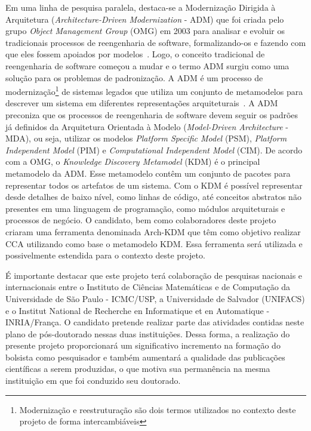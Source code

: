 \documentclass[12pt]{article}
\begin{document}
Em uma linha de pesquisa paralela, destaca-se a Modernização Dirigida à Arquitetura (\textit{Architecture-Driven Modernization} - ADM) que foi criada pelo grupo \textit{Object Management Group} (OMG) em 2003 para analisar e evoluir os tradicionais processos de reengenharia de software, formalizando-os e fazendo com que eles fossem apoiados por modelos~\cite{OMGADM}. Logo, o conceito tradicional de reengenharia de software começou a mudar e o termo ADM surgiu como uma solução para os problemas de padronização. A ADM é um processo de modernização\footnote{Modernização e reestruturação são dois termos utilizados no contexto deste projeto de forma intercambiáveis} de sistemas legados que utiliza um conjunto de metamodelos para descrever um sistema em diferentes representações arquiteturais~\cite{ADM:OMG}. A ADM preconiza que os processos de reengenharia de software devem seguir os padrões já definidos da Arquitetura Orientada à Modelo (\textit{Model-Driven Architecture} - MDA), ou seja, utilizar os modelos \textit{Platform Specific Model} (PSM), \textit{Platform Independent Model} (PIM) e \textit{Computational Independent Model} (CIM). De acordo com a OMG, o \textit{Knowledge Discovery Metamodel} (KDM) é o principal metamodelo da ADM. Esse metamodelo contêm um conjunto de pacotes para representar todos os artefatos de um sistema. Com o KDM é possível representar desde detalhes de baixo nível, como linhas de código, até conceitos abstratos não presentes em uma linguagem de programação, como módulos arquiteturais e processos de negócio. O candidato, bem como colaboradores deste projeto criaram uma ferramenta denominada Arch-KDM que têm como objetivo realizar CCA utilizando como base o metamodelo KDM. Essa ferramenta será utilizada e possivelmente estendida para o contexto deste projeto. 

É importante destacar que este projeto terá colaboração de pesquisas nacionais e internacionais entre o Instituto de Ciências Matemáticas e de Computação da Universidade de São Paulo - ICMC/USP, a Universidade de Salvador (UNIFACS) e o Institut National de Recherche en Informatique et en Automatique - INRIA/França. O candidato pretende realizar parte das atividades contidas neste plano de pós-doutorado nessas duas instituições. Dessa forma, a realização do presente projeto proporcionará um significativo incremento na formação do bolsista como pesquisador e também aumentará a qualidade das publicações científicas a serem produzidas, o que motiva sua permanência na mesma instituição em que foi conduzido seu doutorado.
\end{document}
